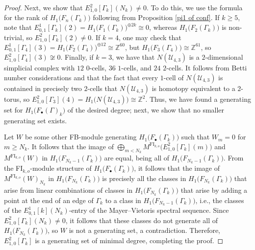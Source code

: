 \documentclass[pagebackref,colorlinks,citecolor=blue,linkcolor=blue,urlcolor=blue,filecolor=blue]{article}
\theoremstyle{definition}\newtheorem{definition}[thm]{Definition}
\theoremstyle{definition}
\newcommand{\Z}{\ensuremath{\mathbb{Z}}}
\begin{document}
\begin{proof}
Next, we show that $E^{2}_{1,0}[\Gamma_{k}](N_{k})\neq 0$.
To do this, we use the formula for the rank of $H_{1}\big(F_{n}(\Gamma_{k})\big)$ following from Proposition \ref{pi1 of conf}.
If $k\ge 5$, note that $E^{1}_{0,1}[\Gamma_{k}](2)=H_{1}\big(F_{1}(\Gamma_{k})\big)^{\oplus 2k}\cong0$, whereas $H_{1}\big(F_{2}(\Gamma_{k})\big)$ is non-trivial, so $E^{2}_{1,0}[\Gamma_{k}](2)\neq 0$.
If $k=4$, one may check that $E^{1}_{0,1}[\Gamma_{4}](3)=H_{1}\big(F_{2}(\Gamma_{4})\big)^{\oplus 12}\cong\Z^{60}$, but $H_{1}\big(F_{3}(\Gamma_{4})\big)\cong\Z^{61}$, so $E^{2}_{1,0}[\Gamma_{4}](3)\not\cong 0$.
Finally, if $k=3$, we have that $N(\mathcal{U}_{4,3})$ is a $2$-dimensional simplicial complex with $12$ $0$-cells, $36$ $1$-cells, and $24$ $2$-cells.
It follows from Betti number considerations and that the fact that every $1$-cell of $N(\mathcal{U}_{4,3})$ is contained in precisely two $2$-cells that $N(\mathcal{U}_{4,3})$ is homotopy equivalent to a $2$-torus, so $E^{2}_{1,0}[\Gamma_{3}](4)=H_{1}\big(N(\mathcal{U}_{4,3})\big)\cong \Z^{2}$. %
Thus, we have found a generating set for $H_{1}\big(F_{\bullet}(\Gamma)_{k}\big)$ of the desired degree; next, we show that no smaller generating set exists.

Let $W$ be some other FB-module generating $H_{1}\big(F_{\bullet}(\Gamma_{k})\big)$ such that $W_{m}=0$ for $m\ge N_{k}$.
It follows that the image of $\bigoplus_{m<N_{k}}M^{\text{FI}_{k,o}}\big(E^{2}_{1,0}[\Gamma_{k}](m)\big)$ and $M^{\text{FI}_{k,o}}(W)$ in $H_{1}\big(F_{N_{k}-1}(\Gamma_{k})\big)$ are equal, being all of $H_{1}\big(F_{N_{k}-1}(\Gamma_{k})\big)$.
From the FI$_{k,o}$-module structure of $H_{1}\big(F_{\bullet}(\Gamma_{k})\big)$, it follows that the image of $M^{\text{FI}_{k,o}}(W)_{N_{k}}$ in $H_{1}\big(F_{N_{k}}(\Gamma_{k})\big)$ is precisely all the classes in $H_{1}\big(F_{N_{k}}(\Gamma_{k})\big)$ that arise from linear combinations of classes in $H_{1}\big(F_{N_{k}}(\Gamma_{k})\big)$ that arise by adding a point at the end of an edge of $\Gamma_{k}$ to a class in $H_{1}\big(F_{N_{k}-1}(\Gamma_{k})\big)$, i.e., the classes of the $E^{1}_{0,1}[k](N_{k})$-entry of the Mayer--Vietoris spectral sequence.
Since $E^{2}_{1,0}[\Gamma_{k}](N_{k})\neq0$, it follows that these classes do not generate all of $H_{1}\big(F_{N_{k}}(\Gamma_{k})\big)$, so $W$ is not a generating set, a contradiction.
Therefore, $E^{2}_{1,0}[\Gamma_{k}]$ is a generating set of minimal degree, completing the proof.
\end{proof}
\end{document}
